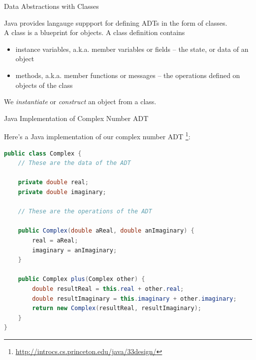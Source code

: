 \documentclass{beamer}
\begin{document}
\begin{frame}{Data Abstractions with Classes}

Java provides langauge suppport for defining ADTs in the form of classes.\\

A class is a blueprint for objects.  A class definition contains
\begin{itemize}
\item instance variables, a.k.a. member variables or fields -- the state, or data of an object
\item methods, a.k.a. member functions or messages -- the operations defined on objects of the class
\end{itemize}
We {\em instantiate} or {\em construct} an object from a class.
\end{frame}


\begin{frame}[fragile]{Java Implementation of Complex Number ADT}\label{complex-class}


Here's a Java implementation of our complex number ADT \footnote{\url{http://introcs.cs.princeton.edu/java/33design/}}:
\vspace{-.05in}
\begin{lstlisting}[language=Java]
public class Complex {
    // These are the data of the ADT

    private double real;
    private double imaginary;

    // These are the operations of the ADT

    public Complex(double aReal, double anImaginary) {
        real = aReal;
        imaginary = anImaginary;
    }

    public Complex plus(Complex other) {
        double resultReal = this.real + other.real;
        double resultImaginary = this.imaginary + other.imaginary;
        return new Complex(resultReal, resultImaginary);
    }
}
\end{lstlisting}


\end{frame}
\end{document}
